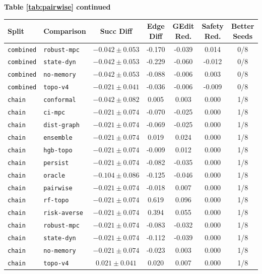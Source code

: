\documentclass{article}
\begin{document}
\begin{center}
\textbf{Table \ref{tab:pairwise} continued}\\[0.4ex]
\begin{tabular}{llccccc}
\toprule
Split & Comparison & Succ Diff & Edge Diff & GEdit Red. & Safety Red. & Better Seeds \\
\midrule
\texttt{combined} & \texttt{robust-mpc} & $-0.042 \pm 0.053$ & -0.170 & -0.039 & 0.014 & 0/8 \\
\texttt{combined} & \texttt{state-dyn} & $-0.042 \pm 0.053$ & -0.229 & -0.060 & -0.012 & 0/8 \\
\texttt{combined} & \texttt{no-memory} & $-0.042 \pm 0.053$ & -0.088 & -0.006 & 0.003 & 0/8 \\
\texttt{combined} & \texttt{topo-v4} & $-0.021 \pm 0.041$ & -0.036 & -0.006 & -0.009 & 0/8 \\
\texttt{chain} & \texttt{conformal} & $-0.042 \pm 0.082$ & 0.005 & 0.003 & 0.000 & 1/8 \\
\texttt{chain} & \texttt{ci-mpc} & $-0.021 \pm 0.074$ & -0.070 & -0.025 & 0.000 & 1/8 \\
\texttt{chain} & \texttt{dist-graph} & $-0.021 \pm 0.074$ & -0.069 & -0.025 & 0.000 & 1/8 \\
\texttt{chain} & \texttt{ensemble} & $-0.021 \pm 0.074$ & 0.019 & 0.024 & 0.000 & 1/8 \\
\texttt{chain} & \texttt{hgb-topo} & $-0.021 \pm 0.074$ & -0.009 & 0.012 & 0.000 & 1/8 \\
\texttt{chain} & \texttt{persist} & $-0.021 \pm 0.074$ & -0.082 & -0.035 & 0.000 & 1/8 \\
\texttt{chain} & \texttt{oracle} & $-0.104 \pm 0.086$ & -0.125 & -0.046 & 0.000 & 1/8 \\
\texttt{chain} & \texttt{pairwise} & $-0.021 \pm 0.074$ & -0.018 & 0.007 & 0.000 & 1/8 \\
\texttt{chain} & \texttt{rf-topo} & $-0.021 \pm 0.074$ & 0.619 & 0.096 & 0.000 & 1/8 \\
\texttt{chain} & \texttt{risk-averse} & $-0.021 \pm 0.074$ & 0.394 & 0.055 & 0.000 & 1/8 \\
\texttt{chain} & \texttt{robust-mpc} & $-0.021 \pm 0.074$ & -0.083 & -0.032 & 0.000 & 1/8 \\
\texttt{chain} & \texttt{state-dyn} & $-0.021 \pm 0.074$ & -0.112 & -0.039 & 0.000 & 1/8 \\
\texttt{chain} & \texttt{no-memory} & $-0.021 \pm 0.074$ & -0.023 & 0.003 & 0.000 & 1/8 \\
\texttt{chain} & \texttt{topo-v4} & $0.021 \pm 0.041$ & 0.020 & 0.007 & 0.000 & 1/8 \\

\end{tabular}
\end{center}
\end{document}
